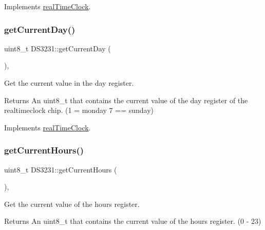 Implements \mbox{\hyperlink{classreal_time_clock_a910bce5ee911c18bd34a4154953ce2ac}{real\+Time\+Clock}}.

\mbox{\label{class_d_s3231_a813bbe55a08e1911d498511795721477}} 
\subsubsection{\texorpdfstring{get\+Current\+Day()}{getCurrentDay()}}
{\footnotesize\ttfamily uint8\+\_\+t D\+S3231\+::get\+Current\+Day (\begin{DoxyParamCaption}{ }\end{DoxyParamCaption})\hspace{0.3cm}{\ttfamily [override]}, {\ttfamily [virtual]}}



Get the current value in the day register. 

\begin{DoxyReturn}{Returns}
An uint8\+\_\+t that contains the current value of the day register of the realtimeclock chip. (1 = monday 7 == sunday) 
\end{DoxyReturn}


Implements \mbox{\hyperlink{classreal_time_clock_a13b8ebc25275f183a1117402fc9e5e36}{real\+Time\+Clock}}.

\mbox{\label{class_d_s3231_a019d8ed8074a02937c0777424be3d0ae}} 
\subsubsection{\texorpdfstring{get\+Current\+Hours()}{getCurrentHours()}}
{\footnotesize\ttfamily uint8\+\_\+t D\+S3231\+::get\+Current\+Hours (\begin{DoxyParamCaption}{ }\end{DoxyParamCaption})\hspace{0.3cm}{\ttfamily [override]}, {\ttfamily [virtual]}}



Get the current value of the hours register. 

\begin{DoxyReturn}{Returns}
An uint8\+\_\+t that contains the current value of the hours register. (0 -\/ 23) 
\end{DoxyReturn}


